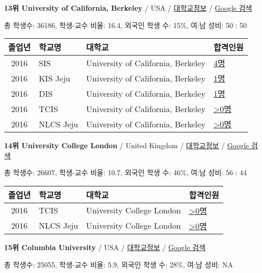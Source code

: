 \documentclass[13pt,]{article}
\begin{document}
\textbf{13위 University of California, Berkeley} / USA /
\href{https://www.timeshighereducation.com/world-university-rankings/university-of-california-berkeley?ranking-dataset=133819}{대학교정보}
/
\href{http://www.google.com/search?q=University+of+California,+Berkeley}{Google
검색}

총 학생수: 36186, 학생-교수 비율: 16.4, 외국인 학생 수: 15\%, 여:남
성비: 50 : 50

\begin{longtable}[]{@{}clll@{}}
\toprule
졸업년 & 학교명 & 대학교 & 합격인원\tabularnewline
\midrule
\endhead
2016 & SIS & University of California, Berkeley &
\href{http://cafe.naver.com/assarabia/11589}{4명}\tabularnewline
2016 & KIS Jeju & University of California, Berkeley &
\href{http://cafe.naver.com/assarabia/11596}{1명}\tabularnewline
2016 & DIS & University of California, Berkeley &
\href{http://cafe.naver.com/assarabia/11591}{1명}\tabularnewline
2016 & TCIS & University of California, Berkeley &
\href{http://cafe.naver.com/assarabia/11598}{\textgreater{}0명}\tabularnewline
2016 & NLCS Jeju & University of California, Berkeley &
\href{http://cafe.naver.com/assarabia/11592}{\textgreater{}0명}\tabularnewline
\bottomrule
\end{longtable}

\textbf{14위 University College London} / United Kingdom /
\href{https://www.timeshighereducation.com/world-university-rankings/university-college-london?ranking-dataset=133819}{대학교정보}
/ \href{http://www.google.com/search?q=University+College+London}{Google
검색}

총 학생수: 26607, 학생-교수 비율: 10.7, 외국인 학생 수: 46\%, 여:남
성비: 56 : 44

\begin{longtable}[]{@{}clll@{}}
\toprule
졸업년 & 학교명 & 대학교 & 합격인원\tabularnewline
\midrule
\endhead
2016 & TCIS & University College London &
\href{http://cafe.naver.com/assarabia/11598}{\textgreater{}0명}\tabularnewline
2016 & NLCS Jeju & University College London &
\href{http://cafe.naver.com/assarabia/11592}{\textgreater{}0명}\tabularnewline
\bottomrule
\end{longtable}

\textbf{15위 Columbia University} / USA /
\href{https://www.timeshighereducation.com/world-university-rankings/columbia-university?ranking-dataset=133819}{대학교정보}
/ \href{http://www.google.com/search?q=Columbia+University}{Google 검색}

총 학생수: 25055, 학생-교수 비율: 5.9, 외국인 학생 수: 28\%, 여:남 성비:
NA
\end{document}
